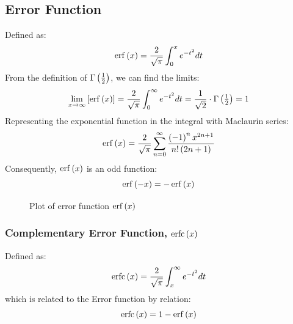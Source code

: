 \subsection{Error Function}
Defined as:
\begin{equation}
    \erff{x}=\frac{2}{\sqrt{\pi}}\intt{0}{x}\e{-t^2}dt
\end{equation}
From the definition of $\Gamma\left(\frac{1}{2}\right)$, we can find the limits:
\begin{equation}
    \lim\limits_{x\to\infty}\sbracket{\erff{x}}=\frac{2}{\sqrt{\pi}}\intt{0}{\infty}\e{-t^2}dt=\frac{1}{\sqrt{2}}\cdot\Gammaa{\tfrac{1}{2}}=1
\end{equation}
Representing the exponential function in the integral with Maclaurin series:
\begin{equation}
    \erff{x}=\frac{2}{\sqrt{\pi}}\summation{n=0}{\infty}\frac{\bracket{-1}^nx^{2n+1}}{n!\bracket{2n+1}}
\end{equation} 
Consequently, $\erff{x}$ is an odd function:
\begin{equation}
    \erff{-x}=-\erff{x}
\end{equation}
\begin{figure}[!ht]
    \centering
    \caption{Plot of error function $\erff{x}$}
    \label{fig:3.3}
\end{figure}
\subsubsection{Complementary Error Function, $\operatorname{erfc}\left(x\right)$}
Defined as:
\begin{equation}
    \operatorname{erfc}\left(x\right)=\frac{2}{\sqrt{\pi}}\int_{x}^{\infty}e^{-t^2}dt
\end{equation}
which is related to the Error function by relation:
\begin{equation}
    \erfcc{x}=1-\erff{x}
\end{equation}

